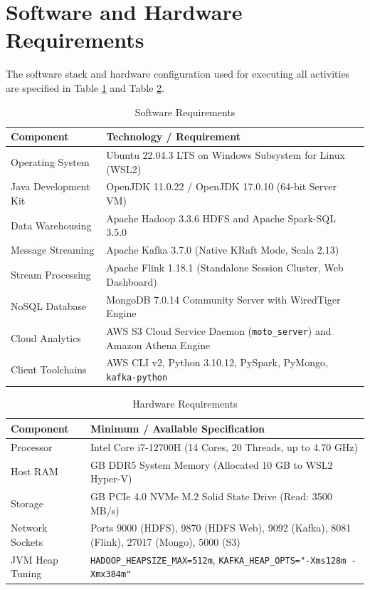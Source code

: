 \documentclass[12pt,a4paper]{report}
\begin{document}
\section{Software and Hardware Requirements}
The software stack and hardware configuration used for executing all activities are specified in Table \ref{tab:software_reqs} and Table \ref{tab:hardware_reqs}.

\begin{table}[H]
\centering
\small
\caption{Software Requirements}
\label{tab:software_reqs}
\begin{tabularx}{\textwidth}{|>{\raggedright\arraybackslash}p{4.2cm}|>{\raggedright\arraybackslash}X|}
\hline
\textbf{Component} & \textbf{Technology / Requirement}\\
\hline
Operating System & Ubuntu 22.04.3 LTS on Windows Subsystem for Linux (WSL2)\\
\hline
Java Development Kit & OpenJDK 11.0.22 / OpenJDK 17.0.10 (64-bit Server VM)\\
\hline
Data Warehousing & Apache Hadoop 3.3.6 HDFS and Apache Spark-SQL 3.5.0\\
\hline
Message Streaming & Apache Kafka 3.7.0 (Native KRaft Mode, Scala 2.13)\\
\hline
Stream Processing & Apache Flink 1.18.1 (Standalone Session Cluster, Web Dashboard)\\
\hline
NoSQL Database & MongoDB 7.0.14 Community Server with WiredTiger Engine\\
\hline
Cloud Analytics & AWS S3 Cloud Service Daemon (\texttt{moto\_server}) and Amazon Athena Engine\\
\hline
Client Toolchains & AWS CLI v2, Python 3.10.12, PySpark, PyMongo, \texttt{kafka-python}\\
\hline
\end{tabularx}
\end{table}

\begin{table}[H]
\centering
\small
\caption{Hardware Requirements}
\label{tab:hardware_reqs}
\begin{tabularx}{\textwidth}{|>{\raggedright\arraybackslash}p{4.2cm}|>{\raggedright\arraybackslash}X|}
\hline
\textbf{Component} & \textbf{Minimum / Available Specification}\\
\hline
Processor & Intel Core i7-12700H (14 Cores, 20 Threads, up to 4.70 GHz)\\
\hline
Host RAM & 16.0 GB DDR5 System Memory (Allocated 10 GB to WSL2 Hyper-V)\\
\hline
Storage & 512 GB PCIe 4.0 NVMe M.2 Solid State Drive (Read: 3500 MB/s)\\
\hline
Network Sockets & Ports 9000 (HDFS), 9870 (HDFS Web), 9092 (Kafka), 8081 (Flink), 27017 (Mongo), 5000 (S3)\\
\hline
JVM Heap Tuning & \texttt{HADOOP\_HEAPSIZE\_MAX=512m}, \texttt{KAFKA\_HEAP\_OPTS="-Xms128m -Xmx384m"}\\
\hline
\end{tabularx}
\end{table}
\end{document}
